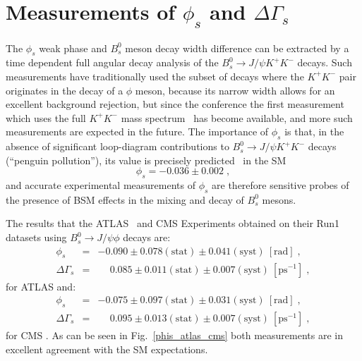 \section{Measurements of $\phi_s$ and $\Delta\Gamma_s$}
\label{sec:phisdgs}

The $\phi_s$ weak phase and $B^0_s$ meson decay width difference can
be extracted by a time dependent full angular decay analysis of the 
$B^0_s \to J/\psi K^+ K^-$ decays. Such measurements have traditionally
used the subset of decays where the $K^+ K^-$ pair originates in the decay
of a $\phi$ meson, because its narrow width allows for an excellent background
rejection, but since the conference the first measurement which uses
the full $K^+ K^-$ mass spectrum~\cite{LHCbKKHighMass} has become available, and
more such measurements are expected in the future. The importance of
$\phi_s$ is that, in the absence of significant loop-diagram contributions
to $B^0_s \to J/\psi K^+ K^-$ decays (``penguin pollution''),
its value is precisely predicted~\cite{PHISSM} in the SM
\begin{equation}  
\phi_s = -0.036 \pm 0.002 \; ,
\end{equation}
and accurate experimental measurements of $\phi_s$ are therefore 
sensitive probes of the presence of BSM effects in the mixing and decay of $B^0_s$ mesons.

The results that the ATLAS~\cite{ATLASPHIS} and CMS Experiments obtained on their Run1
datasets using $B^0_s \to J/\psi \phi$ decays are:
\begin{eqnarray}
  \phi_s & = & -0.090 \pm 0.078 (\mbox{stat}) \pm 0.041 (\mbox{syst})\:[\mbox{rad}] \; , \\
  \Delta\Gamma_s & = & \phantom{-}0.085 \pm 0.011 (\mbox{stat}) \pm 0.007 (\mbox{syst})\:[\mbox{ps}^{-1}]  \; ,
\end{eqnarray}
for ATLAS \cite{atlas_phis_8TeV} and:
\begin{eqnarray}
  \phi_s & = & -0.075 \pm 0.097 (\mbox{stat}) \pm 0.031 (\mbox{syst})\:[\mbox{rad}]  \; , \\
  \Delta\Gamma_s & = & \phantom{-}0.095 \pm 0.013 (\mbox{stat}) \pm 0.007 (\mbox{syst})\:[\mbox{ps}^{-1}]  \; ,
\end{eqnarray}
for CMS \cite{cms_phis}. As can be seen in Fig.~\ref{phis_atlas_cms} both measurements are in
excellent agreement with the SM expectations.

